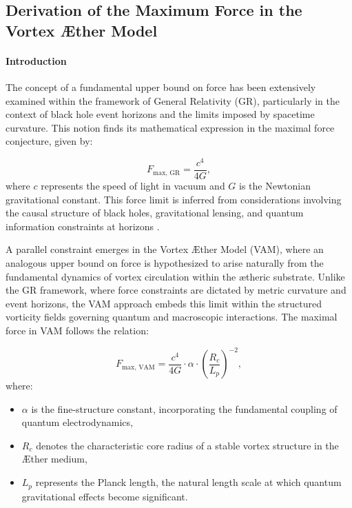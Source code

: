 
\subsection{Derivation of the Maximum Force in the Vortex Æther Model}

\paragraph*{Introduction}
The concept of a fundamental upper bound on force has been extensively examined within the framework of General Relativity (GR), particularly in the context of black hole event horizons and the limits imposed by spacetime curvature. This notion finds its mathematical expression in the maximal force conjecture, given by:


\begin{equation*}
F_{\text{max, GR}} = \frac{c^4}{4G},
\end{equation*}
where $c$ represents the speed of light in vacuum and $G$ is the Newtonian gravitational constant. This force limit is inferred from considerations involving the causal structure of black holes, gravitational lensing, and quantum information constraints at horizons \cite{Schiller2006}.


A parallel constraint emerges in the Vortex Æther Model (VAM), where an analogous upper bound on force is hypothesized to arise naturally from the fundamental dynamics of vortex circulation within the ætheric substrate. Unlike the GR framework, where force constraints are dictated by metric curvature and event horizons, the VAM approach embeds this limit within the structured vorticity fields governing quantum and macroscopic interactions. The maximal force in VAM follows the relation:


\begin{equation*}
F_{\text{max, VAM}} = \frac{c^4}{4G} \cdot \alpha \cdot \left(\frac{R_c}{L_p}\right)^{-2},
\end{equation*}
where:
\begin{itemize}
\item $\alpha$ is the fine-structure constant, incorporating the fundamental coupling of quantum electrodynamics,
\item $R_c$ denotes the characteristic core radius of a stable vortex structure in the Æther medium,
\item $L_p$ represents the Planck length, the natural length scale at which quantum gravitational effects become significant.
\end{itemize}


